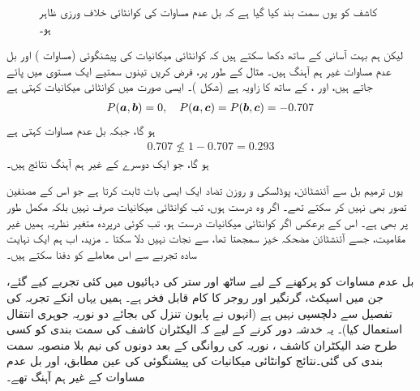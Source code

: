\begin{figure}
\centering
{}
\caption{کاشف کو یوں سمت بند کیا گیا ہے کہ بل عدم مساوات کی کوانٹائی   خلاف ورزی   ظاہر ہو۔}
\label{شکل_بکھراو_بل_عدم_مساوات}
\end{figure}

لیکن ہم بہت آسانی  کے ساتھ  دکھا سکتے ہیں کہ کوانٹائی میکانیات کی پیشنگوئی (مساوات )  اور بل عدم مساوات غیر ہم آہنگ  ہیں۔ مثال کے طور پر،  فرض کریں تینوں   سمتیے  ایک مستوی میں پائے جاتے  ہیں، اور ،   کے ساتھ  کا زاویہ  ہے  (شکل )۔ ایسی صورت میں کوانٹائی میکانیات کہتی ہے  
\begin{align*}
	P({{\boldsymbol{a}}}, {{\boldsymbol{b}}}) = 0,\quad  P({{\boldsymbol{a}}}, {{\boldsymbol{c}}}) = P({{\boldsymbol{b}}}, {{\boldsymbol{c}}}) =\num{-0.707}
\end{align*}
ہو گا، جبکہ بل عدم مساوات کہتی ہے 
\begin{align*}
	\num{0.707}\nleq 1-\num{0.707} = \num{0.293}
\end{align*}
ہو گا، جو ایک دوسرے کے غیر ہم آہنگ نتائج ہیں۔

 یوں  ترمیم بل  سے آئنشٹائن، پوڈلسکی  و  روزن تضاد ایک ایسی بات ثابت  کرتا ہے جو اس کے مصنفین تصور بھی نہیں کر سکتے تھے۔ اگر وہ درست ہوں،  تب  کوانٹائی  میکانیات  صرف    نہیں بلکہ  مکمل طور پر      بھی     ہے۔  اس کے برعکس اگر کوانٹائی میکانیات  درست ہو،  تب کوئی درپردہ متغیر نظریہ ہمیں غیر مقامیت، جسے آئنشٹائن مضحکہ خیز سمجھتا تھا،  سے نجات نہیں دلا  سکتا  ۔ مزید،  اب ہم  ایک نہایت  سادہ  تجربے  سے اس  معاملے   کو  دفنا  سکتے ہیں۔

بل عدم مساوات کو پرکھنے کے لیے ساٹھ اور ستر کی دہائیوں میں کئی تجربے کیے  گئے،  جن میں  اسپکٹ، گرنگیر اور روجر کا کام قابل فخر ہے۔ ہمیں یہاں انکے تجربہ کی تفصیل سے دلچسپی نہیں ہے (انہوں نے پایون تنزل کی بجائے دو نوریہ  جوہری انتقال استعمال کیا)۔  یہ خدشہ دور کرنے کے لیے کہ الیکٹران کاشف کی سمت بندی کو کسی طرح ضد الیکٹران کاشف   ،   نوریہ کی روانگی کے بعد دونوں کی  نیم بلا منصوبہ سمت بندی   کی گئی۔نتائج کوانٹائی میکانیات کی پیشنگوئی  کی عین مطابق،  اور بل عدم مساوات کے غیر ہم آہنگ تھے۔

